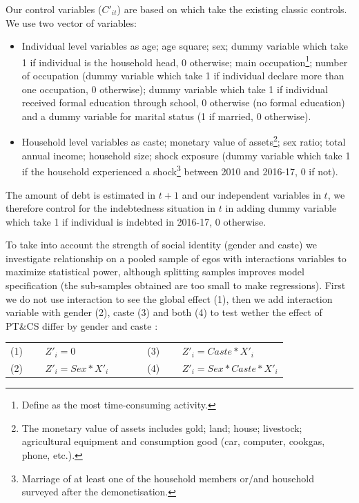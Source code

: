 \documentclass[a4paper, 11pt, onecolumn]{article}
\begin{document}
Our control variables ($C'_{it}$) are based on \cite{Reboul2021, Brown2014, Chichaibelu2017} which take the existing classic controls. 
We use two vector of variables:
\begin{itemize}
\item Individual level variables as age; age square; sex; dummy variable which take 1 if individual is the household head, 0 otherwise; main occupation\footnote{Define as the most time-consuming activity.}; number of occupation (dummy variable which take 1 if individual declare more than one occupation, 0 otherwise); dummy variable which take 1 if individual received formal education through school, 0 otherwise (no formal education) and a dummy variable for marital status (1 if married, 0 otherwise). 
\item Household level variables as caste; monetary value of assets\footnote{The monetary value of assets includes gold; land; house; livestock; agricultural equipment and consumption good (car, computer, cookgas, phone, etc.).}; sex ratio; total annual income; household size; shock exposure (dummy variable which take 1 if the household experienced a shock\footnote{Marriage of at least one of the household members or/and household surveyed after the demonetisation.} between 2010 and 2016-17, 0 if not). 
\end{itemize}
The amount of debt is estimated in $t+1$ and our independent variables in $t$, we therefore control for the indebtedness situation in $t$ in adding dummy variable which take 1 if individual is indebted in 2016-17, 0 otherwise.

To take into account the strength of social identity (gender and caste) we investigate relationship on a pooled sample of egos with interactions variables to maximize statistical power, although splitting samples improves model specification (the sub-samples obtained are too small to make regressions).
First we do not use interaction to see the global effect (1), then we add interaction variable with gender (2), caste (3) and both (4) to test wether the effect of PT\&CS differ by gender and caste :

\begin{table}[h!]
  \centering
    \begin{tabular}{lllll}
    (1)~~~~ $Z'_{i}=0$ & & & & (3)~~~~ $Z'_{i}=Caste*X'_{i}$ \\
    (2)~~~~ $Z'_{i}=Sex*X'_{i}$ & & & & (4)~~~~ $Z'_{i}=Sex*Caste*X'_{i}$ \\
    \end{tabular}%
\end{table}%
\end{document}
